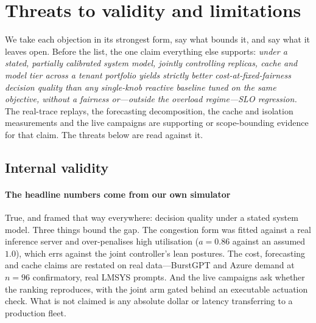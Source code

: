\section{Threats to validity and limitations}
\label{sec:threats}

We take each objection in its strongest form, say what bounds it, and say
what it leaves open. Before the list, the one claim everything else
supports: \emph{under a stated, partially calibrated system model, jointly
controlling replicas, cache and model tier across a tenant portfolio
yields strictly better cost-at-fixed-fairness decision quality than any
single-knob reactive baseline tuned on the same objective, without a
fairness or---outside the overload regime---SLO regression.} The real-trace
replays, the forecasting decomposition, the cache and isolation
measurements and the live campaigns are supporting or scope-bounding
evidence for that claim. The threats below are read against it.

\subsection{Internal validity}

\paragraph{The headline numbers come from our own simulator} True, and
framed that way everywhere: decision quality under a stated system model.
Three things bound the gap. The congestion form was fitted against a real
inference server and over-penalises high utilisation ($a = 0.86$ against
an assumed $1.0$), which errs against the joint controller's lean
postures. The cost, forecasting and cache claims are restated on real
data---BurstGPT and Azure demand at $n = 96$ confirmatory, real LMSYS
prompts. And the live campaigns ask whether the ranking reproduces, with
the joint arm gated behind an executable actuation check. What is not
claimed is any absolute dollar or latency transferring to a production
fleet.

